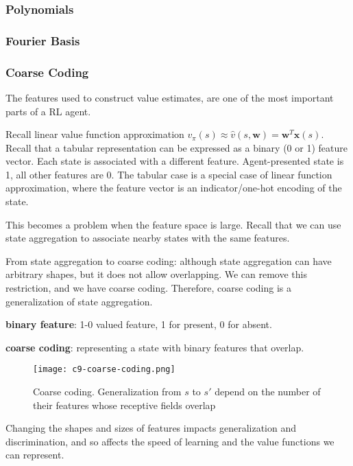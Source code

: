 \documentclass[sutton_barto_notes.tex]{subfiles}
\begin{document}
\subsubsection{Polynomials}
\subsubsection{Fourier Basis}
\subsubsection{Coarse Coding}

The features used to construct value estimates, are one of the most important parts of a RL agent.

Recall linear value function approximation $v_\pi(s) \approx \hat{v}(s,\bm{w}) = \bm{w}^T\bm{x}(s)$. Recall that a tabular representation can be expressed as a binary (0 or 1) feature vector. Each state is associated with a different feature. Agent-presented state is 1, all other features are 0. The tabular case is a special case of linear function approximation, where the feature vector is an indicator/one-hot encoding of the state.

This becomes a problem when the feature space is large. Recall that we can use state aggregation to associate nearby states with the same features.

From state aggregation to coarse coding: although state aggregation can have arbitrary shapes, but it does not allow overlapping. We can remove this restriction, and we have coarse coding. Therefore, coarse coding is a generalization of state aggregation.

\begin{definition}
\textbf{binary feature}: 1-0 valued feature, 1 for present, 0 for absent.
\end{definition}
\begin{definition}
\textbf{coarse coding}: representing a state with binary features that overlap.
\end{definition}

\begin{figure}[h!]
  \centering
  \texttt{[image: c9-coarse-coding.png]}
  \caption{Coarse coding. Generalization from $s$ to $s'$ depend on the number of their features whose receptive fields overlap}
  \label{fig:coarse-coding}
\end{figure}

Changing the shapes and sizes of features impacts generalization and discrimination, and so affects the speed of learning and the value functions we can represent.
\end{document}
